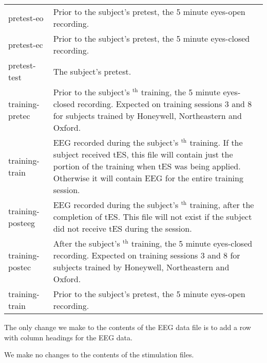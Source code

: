 \documentclass[letterpaper,10pt,english]{sphinxmanual}
\begin{document}
\begin{savenotes}\sphinxattablestart
\centering
\begin{tabulary}{\linewidth}[t]{|T|T|}
\hline
{}\relax &\relax \\
\hline
pretest-eo
&
Prior to the subject’s pretest, the 5 minute eyes-open recording.
\\
\hline
pretest-ec
&
Prior to the subject’s pretest, the 5 minute eyes-closed recording.
\\
\hline
pretest-test
&
The subject’s pretest.
\\
\hline
training-pretec
&
Prior to the subject’s $^{\text{th}}$ training, the 5 minute eyes-closed recording. Expected on training sessions 3 and 8 for subjects trained by Honeywell, Northeastern and Oxford.
\\
\hline
training-train
&
EEG recorded during the subject’s $^{\text{th}}$ training. If the subject received tES, this file will contain just the portion of the training when tES was being applied. Otherwise it will contain EEG for the entire training session.
\\
\hline
training-posteeg
&
EEG recorded during the subject’s $^{\text{th}}$ training, after the completion of tES. This file will not exist if the subject did not receive tES during the session.
\\
\hline
training-postec
&
After the subject’s $^{\text{th}}$ training, the 5 minute eyes-closed recording. Expected on training sessions 3 and 8 for subjects trained by Honeywell, Northeastern and Oxford.
\\
\hline
training-train
&
Prior to the subject’s pretest, the 5 minute eyes-open recording.
\\
\hline
\end{tabulary}
\par
\sphinxattableend\end{savenotes}

The only change we make to the contents of the EEG data file is to add a
row with column headings for the EEG data.

We make no changes to the contents of the stimulation files.
\end{document}
